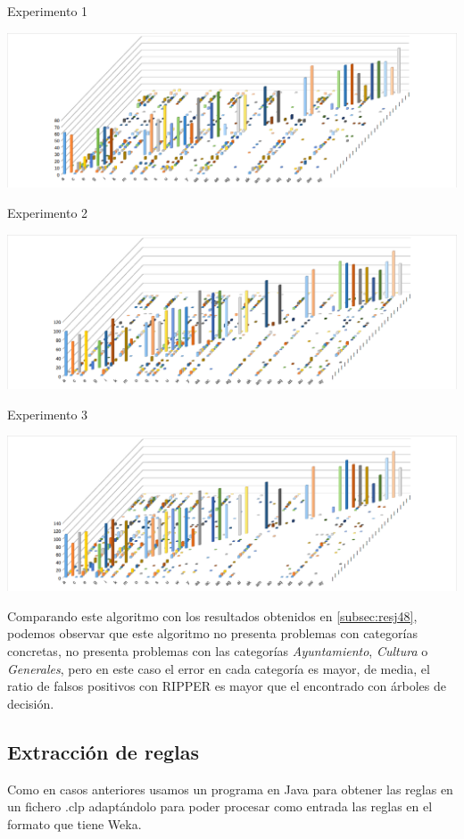Experimento 1
\begin{center}
\includegraphics[width=\textwidth]{ripper/RIPPER_80_CV15.png} 
\end{center}
Experimento 2
\begin{center}
\includegraphics[width=\textwidth]{ripper/RIPPER_125_CV15.png} 
\end{center}
Experimento 3
\begin{center}
\includegraphics[width=\textwidth]{ripper/RIPPER_175_CV15.png} 
\end{center}

Comparando este algoritmo con los resultados obtenidos en \ref{subsec:resj48}, podemos observar que este algoritmo no presenta problemas con categorías concretas, no presenta problemas con las categorías \textit{Ayuntamiento}, \textit{Cultura} o \textit{Generales}, pero en este caso el error en cada categoría es mayor, de media, el ratio de falsos positivos con RIPPER es mayor que el encontrado con árboles de decisión.
\subsection{Extracción de reglas}

Como en casos anteriores usamos un programa en Java para obtener las reglas en un fichero .clp adaptándolo para poder procesar como entrada las reglas en el formato que tiene Weka.
 



